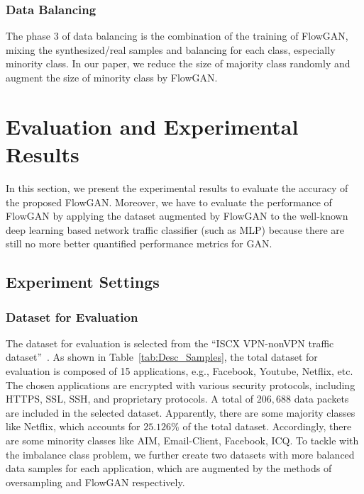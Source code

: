 \documentclass[letterpaper,12pt]{article}
\begin{document}
\subsubsection{Data Balancing}
The phase 3 of data balancing is the combination of the training of FlowGAN, mixing the synthesized/real samples and balancing for each class, especially minority class. In our paper, we reduce the size of majority class randomly and augment the size of minority class by FlowGAN.



\section{Evaluation and Experimental Results}\label{sec:results}
In this section, we present the experimental results to evaluate the accuracy of the proposed FlowGAN. Moreover, we have to evaluate the performance of FlowGAN by applying the dataset augmented by FlowGAN to the well-known deep learning based network traffic classifier (such as MLP) because there are still no more better quantified performance metrics for GAN.


\subsection{Experiment Settings}\label{sec:expdes}
\subsubsection{Dataset for Evaluation}\label{sec:dataset}

The dataset for evaluation is selected from the ``ISCX VPN-nonVPN traffic dataset''~\cite{ISCX}. As shown in Table~\ref{tab:Desc_Samples}, the total dataset for evaluation is composed of 15 applications, e.g., Facebook, Youtube, Netflix, etc. The chosen applications are encrypted with various security protocols, including HTTPS, SSL, SSH, and proprietary protocols. A total of $206,688$ data packets are included in the selected dataset. Apparently, there are some majority classes like Netflix, which accounts for $25.126\%$ of the total dataset. Accordingly, there are some minority classes like AIM, Email-Client, Facebook, ICQ. To tackle with the imbalance class problem, we further create two datasets with more balanced data samples for each application, which are augmented by the methods of oversampling and FlowGAN respectively. 
\end{document}
